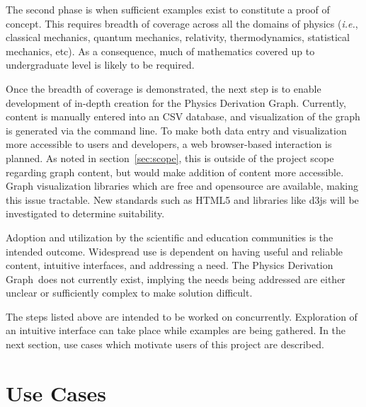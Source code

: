\documentclass{article}
\newcommand{\ie}{\textit{i.e.}} %
\newcommand{\pdg}{Physics Derivation Graph}
\begin{document}
\begin{multicols}{2}
The second phase is when sufficient examples exist to constitute a proof of concept. This requires breadth of coverage across all the domains of physics (\ie, classical mechanics, quantum mechanics, relativity, thermodynamics, statistical mechanics, etc). As a consequence, much of mathematics covered up to undergraduate level is likely to be required. 

Once the breadth of coverage is demonstrated, the next step is to enable development of in-depth creation for the \pdg. Currently, content is manually entered into an CSV database, and visualization of the graph is generated via the command line. To make both data entry and visualization more accessible to users and developers, a web browser-based interaction is planned. As noted in section~\ref{sec:scope}, this is outside of the project scope regarding graph content, but would make addition of content more accessible. Graph visualization libraries which are free and opensource are available, making this issue tractable. New standards such as HTML5 and libraries like d3js will be investigated to determine suitability. 

Adoption and utilization by the scientific and education communities is the intended outcome. Widespread use is dependent on having useful and reliable content, intuitive interfaces, and addressing a need. The \pdg\ does not currently exist, implying the needs being addressed are either unclear or sufficiently complex to make solution difficult. 

The steps listed above are intended to be worked on concurrently. Exploration of an intuitive interface can take place while examples are being gathered. In the next section, use cases which motivate users of this project are described. 



\section{Use Cases\label{sec:use_cases}}


\end{multicols}
\end{document}
